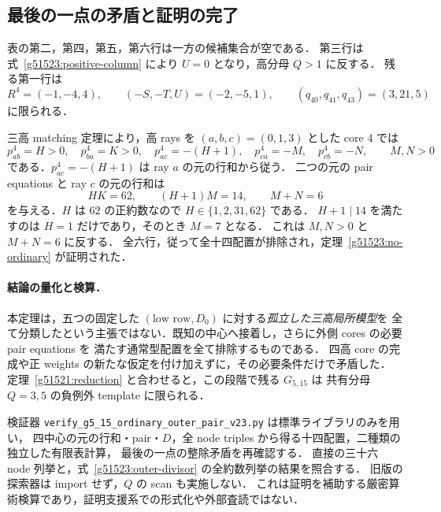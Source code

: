 \subsection{最後の一点の矛盾と証明の完了}

表の第二，第四，第五，第六行は一方の候補集合が空である．
第三行は式~\eqref{g51523:positive-column} により $U=0$ となり，高分母 $Q>1$ に反する．
残る第一行は
\[
 R^4=(-1,-4,4),\qquad (-S,-T,U)=(-2,-5,1),\qquad
 (q_{40},q_{41},q_{43})=(3,21,5)
\]
に限られる．

三高 matching 定理により，高 rays を $(a,b,c)=(0,1,3)$ とした core $4$ では
\[
 p^4_{ab}=H>0,\quad p^4_{ba}=K>0,\quad
 p^4_{ac}=-(H+1),\quad p^4_{ca}=-M,\quad p^4_{cb}=-N,
 \qquad M,N>0
\]
である．$p^4_{ac}=-(H+1)$ は ray $a$ の元の行和から従う．
二つの元の pair equations と ray $c$ の元の行和は
\begin{equation}\label{g51523:last-point}
 HK=62,\qquad (H+1)M=14,\qquad M+N=6
\end{equation}
を与える．$H$ は $62$ の正約数なので $H\in\{1,2,31,62\}$ である．
$H+1\mid14$ を満たすのは $H=1$ だけであり，そのとき $M=7$ となる．
これは $M,N>0$ と $M+N=6$ に反する．
全六行，従って全十四配置が排除され，定理~\ref{g51523:no-ordinary} が証明された．

\paragraph{結論の量化と検算．}
本定理は，五つの固定した $(\text{low row},D_0)$ に対する\emph{孤立した三高局所模型}を
全て分類したという主張ではない．既知の中心へ接着し，さらに外側 cores の必要 pair equations を
満たす通常型配置を全て排除するものである．
四高 core の完成や正 weights の新たな仮定を付け加えずに，その必要条件だけで矛盾した．
定理~\ref{g51521:reduction} と合わせると，この段階で残る $G_{5,15}$ は
共有分母 $Q=3,5$ の負例外 template に限られる．

検証器 \nolinkurl{verify_g5_15_ordinary_outer_pair_v23.py} は標準ライブラリのみを用い，
四中心の元の行和・pair・$D$，全 node triples から得る十四配置，二種類の独立した有限表計算，
最後の一点の整除矛盾を再確認する．
直接の三十六 node 列挙と，式~\eqref{g51523:outer-divisor} の全約数列挙の結果を照合する．
旧版の探索器は import せず，$Q$ の scan も実施しない．
これは証明を補助する厳密算術検算であり，証明支援系での形式化や外部査読ではない．
